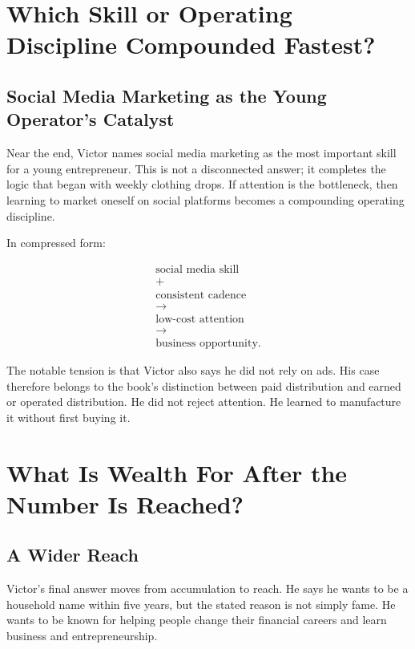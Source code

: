 \documentclass[11pt,oneside]{book}
\begin{document}
\chapter{Which Skill or Operating Discipline Compounded Fastest?}

\section{Social Media Marketing as the Young Operator's Catalyst}

Near the end, Victor names social media marketing as the most important skill for a young entrepreneur. This is not a disconnected answer; it completes the logic that began with weekly clothing drops. If attention is the bottleneck, then learning to market oneself on social platforms becomes a compounding operating discipline.

In compressed form:

\begin{equation}
\begin{gathered}
\text{social media skill}\\
+\\
\text{consistent cadence}\\
\longrightarrow\\
\text{low-cost attention}\\
\longrightarrow\\
\text{business opportunity}.
\end{gathered}
\end{equation}

The notable tension is that Victor also says he did not rely on ads. His case therefore belongs to the book's distinction between paid distribution and earned or operated distribution. He did not reject attention. He learned to manufacture it without first buying it.

\chapter{What Is Wealth For After the Number Is Reached?}

\section{A Wider Reach}

Victor's final answer moves from accumulation to reach. He says he wants to be a household name within five years, but the stated reason is not simply fame. He wants to be known for helping people change their financial careers and learn business and entrepreneurship.
\end{document}

